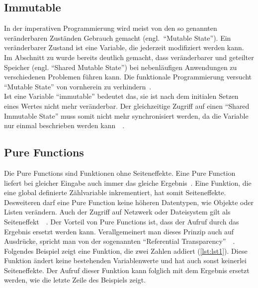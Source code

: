 \subsection{Immutable}
In der imperativen Programmierung wird meist von den so genannten veränderbaren Zuständen Gebrauch gemacht (engl.~\enquote{Mutable State}). Ein veränderbarer Zustand ist eine Variable, die jederzeit modifiziert werden kann. Im Abschnitt zu  wurde bereits deutlich gemacht, dass veränderbarer und geteilter Speicher (engl. \enquote{Shared Mutable State}) bei nebenläufigen Anwendungen zu verschiedenen Problemen führen kann. Die funktionale Programmierung versucht \enquote{Mutable State} von vornherein zu verhindern~\cite[S.~50]{butcher_seven_2014}.\\
Ist eine Variable \enquote{immutable} bedeutet das, sie ist nach dem initialen Setzen eines Wertes nicht mehr veränderbar. Der gleichzeitige Zugriff auf einen \enquote{Shared Immutable State} muss somit nicht mehr synchronisiert werden, da die Variable nur einmal beschrieben werden kann~\cite[S.~50]{butcher_seven_2014}~\cite[S.~62]{kuhn_reactive_2015}.\\

\pagebreak

\subsection{Pure Functions}
Die Pure Functions sind Funktionen ohne Seiteneffekte. Eine Pure Function liefert bei gleicher Eingabe auch immer das gleiche Ergebnis~\cite[S.~61]{kuhn_reactive_2015}. Eine Funktion, die eine global definierte Zählvariable inkrementiert, hat somit Seiteneffekte. Desweiteren darf eine Pure Function keine höheren Datentypen, wie Objekte oder Listen verändern. Auch der Zugriff auf Netzwerk oder Dateisystem gilt als Seiteneffekt~\cite[S.~3]{chiusano_functional_2015}~\cite[S.~62]{kuhn_reactive_2015}.
Der Vorteil von Pure Functions ist, dass der Aufruf durch das Ergebnis ersetzt werden kann. Verallgemeinert man dieses Prinzip auch auf Ausdrücke, spricht man von der sogenannten \enquote{Referential Transparency}~\cite[S.~9]{chiusano_functional_2015}~\cite[S.~62]{kuhn_reactive_2015}. Folgendes Beispiel zeigt eine Funktion, die zwei Zahlen addiert (\ref{lst:lst1}). Diese Funktion ändert keine bestehenden Variablenwerte und hat auch sonst keinerlei Seiteneffekte. Der Aufruf dieser Funktion kann folglich mit dem Ergebnis ersetzt werden, wie die letzte Zeile des Beispiels zeigt.

